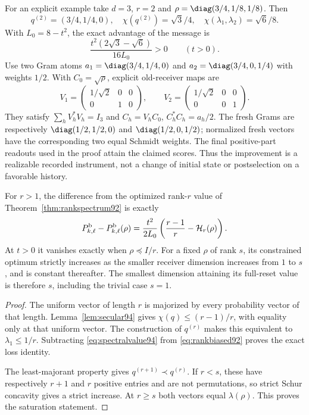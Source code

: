 For an explicit example take $d=3$, $r=2$ and
$\rho=\diag(3/4,1/8,1/8)$.  Then
\[
 q^{(2)}=(3/4,1/4,0),\quad
 \chi(q^{(2)})=\sqrt3/4,\quad
 \chi(\lambda_1,\lambda_2)=\sqrt6/8.
\]
With $L_0=8-t^2$, the exact advantage of the message is
\begin{equation}\label{eq:messageexample94}
 \frac{t^2(2\sqrt3-\sqrt6)}{16L_0}>0\qquad(t>0).
\end{equation}
Use two Gram atoms
$a_1=\diag(3/4,1/4,0)$ and $a_2=\diag(3/4,0,1/4)$ with
weights $1/2$.  With $C_0=\sqrt\rho$, explicit old-receiver maps are
\[
 V_1=\begin{pmatrix}1/\sqrt2&0&0\\0&1&0\end{pmatrix},\qquad
 V_2=\begin{pmatrix}1/\sqrt2&0&0\\0&0&1\end{pmatrix}.
\]
They satisfy $\sum_hV_h^*V_h=I_3$ and
$C_h=V_hC_0$, $C_h^*C_h=a_h/2$.
The fresh Grams are respectively
$\diag(1/2,1/2,0)$ and $\diag(1/2,0,1/2)$; normalized fresh
vectors have the corresponding two equal Schmidt weights.  The final
positive-part readouts used in the proof attain the claimed scores.
Thus the improvement is a realizable recorded instrument, not a
change of initial state or postselection on a favorable history.

\begin{corollary}\label{cor:spectralsaturation94}
For $r>1$, the difference from the optimized rank-$r$ value of
Theorem~\ref{thm:rankspectrum92} is exactly
\begin{equation}\label{eq:exactspectralloss94}
 P_{k,\ell}^{\rm b}-P_{k,\ell}^{\rm b}(\rho)
       =\frac{t^2}{2L_0}\left(\frac{r-1}{r}-\mathcal H_r(\rho)\right).
\end{equation}
At $t>0$ it vanishes exactly when $\rho\preceq I/r$.
For a fixed $\rho$ of rank $s$, its constrained optimum strictly
increases as the smaller receiver dimension increases from $1$ to
$s$, and is constant thereafter.  The smallest dimension attaining
its full-reset value is therefore $s$, including the trivial case
$s=1$.
\end{corollary}
\begin{proof}
The uniform vector of length $r$ is majorized by every probability
vector of that length.  Lemma~\ref{lem:secular94} gives
$\chi(q)\le(r-1)/r$, with equality only at that uniform vector.
The construction of $q^{(r)}$ makes this equivalent to
$\lambda_1\le1/r$.  Subtracting \eqref{eq:spectralvalue94} from
\eqref{eq:rankbiased92} proves the exact loss identity.

The least-majorant property gives
$q^{(r+1)}\prec q^{(r)}$.  If $r<s$, these have respectively $r+1$
and $r$ positive entries and are not permutations, so strict Schur
concavity gives a strict increase.  At $r\ge s$ both vectors equal
$\lambda(\rho)$.  This proves the saturation statement.
\end{proof}

